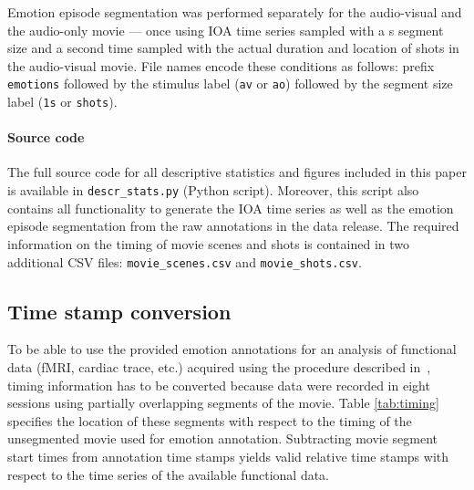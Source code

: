 \documentclass[10pt,a4paper,twocolumn]{article}
\begin{document}
Emotion episode segmentation was performed separately for the audio-visual and
the audio-only movie --- once using IOA time series sampled with a \unit[1]{s}
segment size and a second time sampled with the actual duration and location of
shots in the audio-visual movie. File names encode these conditions as follows:
prefix \texttt{emotions} followed by the stimulus label (\texttt{av} or
\texttt{ao}) followed by the segment size label (\texttt{1s} or \texttt{shots}).


\paragraph{Source code}

The full source code for all descriptive statistics and figures included in
this paper is available in \texttt{descr\_stats.py} (Python script). Moreover,
this script also contains all functionality to generate the IOA time series as
well as the emotion episode segmentation from the raw annotations in the data
release. The required information on the timing of movie scenes and shots is
contained in two additional CSV files: \texttt{movie\_scenes.csv} and
\texttt{movie\_shots.csv}.


\subsection*{Time stamp conversion}

To be able to use the provided emotion annotations for an analysis of
functional data (fMRI, cardiac trace, etc.) acquired using the procedure
described in~\cite{HBI+14}, timing information has to be converted because data
were recorded in eight sessions using partially overlapping segments of the
movie. Table \ref{tab:timing} specifies the location of these segments with
respect to the timing of the unsegmented movie used for emotion annotation.
Subtracting movie segment start times from annotation time stamps yields valid
relative time stamps with respect to the time series of the available
functional data.
\end{document}
